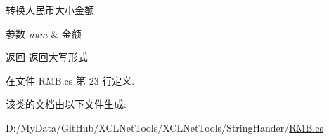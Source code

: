 转换人民币大小金额 


\begin{DoxyParams}{参数}
{\em num} & 金额\\
\hline
\end{DoxyParams}
\begin{DoxyReturn}{返回}
返回大写形式
\end{DoxyReturn}


在文件 R\+M\+B.\+cs 第 23 行定义.



该类的文档由以下文件生成\+:\begin{DoxyCompactItemize}
\item 
D\+:/\+My\+Data/\+Git\+Hub/\+X\+C\+L\+Net\+Tools/\+X\+C\+L\+Net\+Tools/\+String\+Hander/\hyperlink{_r_m_b_8cs}{R\+M\+B.\+cs}\end{DoxyCompactItemize}
